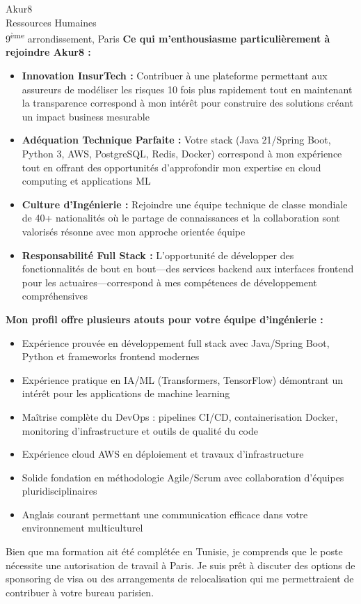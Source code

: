 \documentclass[11pt,a4paper]{letter}
\begin{document}
\begin{letter}{
    Akur8 \\
    Ressources Humaines \\
    9\textsuperscript{ème} arrondissement, Paris
}
\textbf{Ce qui m'enthousiasme particulièrement à rejoindre Akur8 :}

\begin{itemize}
    \item \textbf{Innovation InsurTech :} Contribuer à une plateforme permettant aux assureurs de modéliser les risques 10 fois plus rapidement tout en maintenant la transparence correspond à mon intérêt pour construire des solutions créant un impact business mesurable
    \item \textbf{Adéquation Technique Parfaite :} Votre stack (Java 21/Spring Boot, Python 3, AWS, PostgreSQL, Redis, Docker) correspond à mon expérience tout en offrant des opportunités d'approfondir mon expertise en cloud computing et applications ML
    \item \textbf{Culture d'Ingénierie :} Rejoindre une équipe technique de classe mondiale de 40+ nationalités où le partage de connaissances et la collaboration sont valorisés résonne avec mon approche orientée équipe
    \item \textbf{Responsabilité Full Stack :} L'opportunité de développer des fonctionnalités de bout en bout---des services backend aux interfaces frontend pour les actuaires---correspond à mes compétences de développement compréhensives
\end{itemize}

\textbf{Mon profil offre plusieurs atouts pour votre équipe d'ingénierie :}

\begin{itemize}
    \item Expérience prouvée en développement full stack avec Java/Spring Boot, Python et frameworks frontend modernes
    \item Expérience pratique en IA/ML (Transformers, TensorFlow) démontrant un intérêt pour les applications de machine learning
    \item Maîtrise complète du DevOps : pipelines CI/CD, containerisation Docker, monitoring d'infrastructure et outils de qualité du code
    \item Expérience cloud AWS en déploiement et travaux d'infrastructure
    \item Solide fondation en méthodologie Agile/Scrum avec collaboration d'équipes pluridisciplinaires
    \item Anglais courant permettant une communication efficace dans votre environnement multiculturel
\end{itemize}

Bien que ma formation ait été complétée en Tunisie, je comprends que le poste nécessite une autorisation de travail à Paris. Je suis prêt à discuter des options de sponsoring de visa ou des arrangements de relocalisation qui me permettraient de contribuer à votre bureau parisien.


\end{letter}
\end{document}
